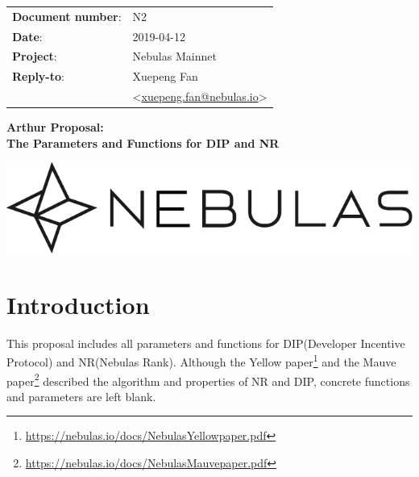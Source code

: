\documentclass[11pt]{article}
\begin{document}
\begin{titlepage}
    \begin{center}
        \vspace*{1cm}

\begin{flushright}
  \begin{tabular}{ll}
  \textbf{Document number}:& N2 \\
  \textbf{Date}:       & 2019-04-12 \\
  \textbf{Project}:    & Nebulas Mainnet \\
  \textbf{Reply-to}:   & {Xuepeng Fan}\\
              &
              \textless\href{mailto:xuepeng.fan@nebulas.io}{xuepeng.fan@nebulas.io}\textgreater
  \end{tabular}
\end{flushright}

\vspace{2cm}
        \Huge

        \textbf{Arthur Proposal: \\The Parameters and Functions for DIP and NR}

        \vspace{0.5cm}

        \vfill
        \vspace{0.5cm}
        \includegraphics[scale=0.3]{Nebulas.png}
    \end{center}
\end{titlepage}

\section{Introduction}
This proposal includes all parameters and functions for DIP(Developer Incentive
Protocol) and NR(Nebulas Rank). Although the Yellow
paper\footnote{\url{https://nebulas.io/docs/NebulasYellowpaper.pdf}} and the
Mauve paper\footnote{\url{https://nebulas.io/docs/NebulasMauvepaper.pdf}}
described the algorithm and properties of NR and DIP, concrete functions and
parameters are left blank.
\end{document}
